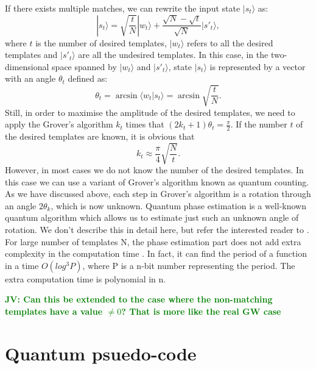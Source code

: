 \documentclass[aps,prd,nofootinbib,twocolumn,reprint,superscriptaddress,showpacs,showkeys,longbibliography]{revtex4-1}
\newcommand{\ket}[1]{|#1\rangle}
\newcommand{\braket}[2]{\langle #1|#2\rangle}
\newcommand{\jv}[1]{\textbf{\textcolor{green}{JV: #1}}}
\begin{document}
If there exists multiple matches, we can rewrite the input state $\ket{s_t}$ as:
\begin{equation}
    \label{som}
    \ket{s_t}=\sqrt{\frac{t}{N}}\ket{w_t}+\frac{\sqrt{N}-\sqrt{t}}{\sqrt{N}}\ket{s'_t},
\end{equation}
where $t$ is the number of desired templates, $\ket{w_t}$ refers to all the desired templates and $\ket{s'_t}$ are all the undesired templates. In this case, in the two-dimensional space spanned by $\ket{w_t}$ and $\ket{s'_t}$, state $\ket{s_t}$ is represented by a vector with an angle $\theta_t$ defined as:
\begin{equation}
\label{thetat}
   \theta_t=\arcsin\braket{w_t}{s_t}=\arcsin {\sqrt{\frac{t}{N}}}. 
\end{equation}
Still, in order to maximise the amplitude of the desired templates, we need to apply the Grover's algorithm $k_t$ times that $(2k_t+1)\theta_t=\frac{\pi}{2}$. If the number $t$ of the desired templates are known, it is obvious that
\begin{equation}
\label{kt}
    k_t\approx\frac{\pi}{4}\sqrt{\frac{N}{t}}.
\end{equation}
However, in most cases we do not know the number of the desired templates. In this case we can use a variant of Grover's algorithm known as quantum counting\cite{brassard1998quantum}. As we have discussed above, each step in Grover's algorithm is a rotation through an angle $2 \theta_k$, which is now unknown. Quantum phase estimation is a well-known quantum algorithm which allows us to estimate just such an unknown angle of rotation. We don't describe this in detail here, but refer the interested reader to \cite{nielsen2002quantum}. For large number of templates N, the phase estimation part does not add extra complexity in the computation time \cite{brassard1998quantum}. In fact, it can find the period of a function in a time $O(log^3P)$, where P is a n-bit number representing the period. The extra computation time is polynomial in n.\cite{barnett2009quantum}

\jv{Can this be extended to the case where the non-matching templates have a value $\neq0$? That is more like the real GW case}

\section{Quantum psuedo-code}\label{sec:psuedocode}
\end{document}
